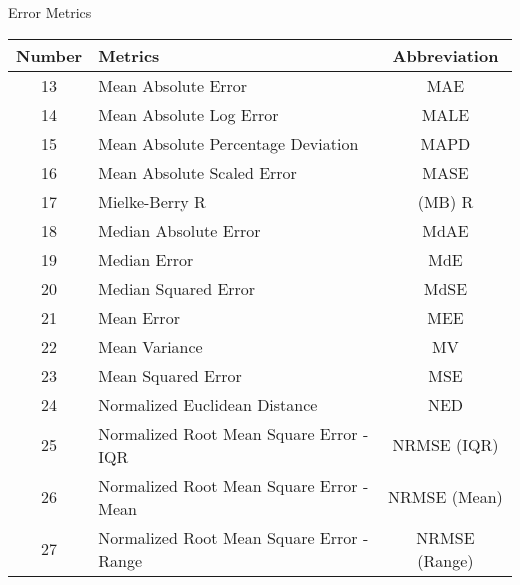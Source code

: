 \documentclass[xcolor={dvipsnames}]{beamer}
\begin{document}
\begin{frame}{Error Metrics}
\begin{center}
\begin{tabular}{|>{\tiny}c|>{\tiny}l|>{\tiny}c|}
\hline
\textbf{Number} & \textbf{Metrics} & \textbf{Abbreviation} \\
\hline
13 & Mean Absolute Error & MAE \\
14 & Mean Absolute Log Error & MALE \\
15 & Mean Absolute Percentage Deviation & MAPD \\
16 & Mean Absolute Scaled Error & MASE \\
17 & Mielke-Berry R & (MB) R \\
18 & Median Absolute Error & MdAE \\
19 & Median Error & MdE \\
20 & Median Squared Error & MdSE \\
21 & Mean Error & MEE \\
22 & Mean Variance & MV \\
23 & Mean Squared Error & MSE \\
24 & Normalized Euclidean Distance & NED \\
25 & Normalized Root Mean Square Error - IQR & NRMSE (IQR) \\
26 & Normalized Root Mean Square Error - Mean & NRMSE (Mean) \\
27 & Normalized Root Mean Square Error - Range & NRMSE (Range) \\
\hline
\end{tabular}
\end{center}    
\end{frame}
\end{document}

